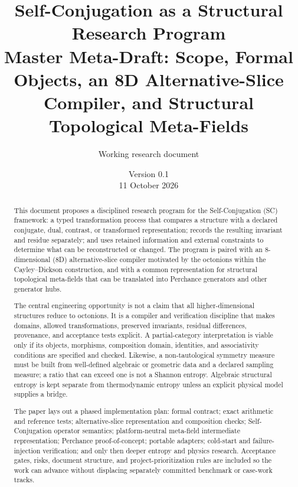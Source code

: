 \documentclass[11pt,oneside]{article}
\title{\textbf{Self-Conjugation as a Structural Research Program}\\[0.4em]
\large Master Meta-Draft: Scope, Formal Objects, an 8D Alternative-Slice Compiler, and Structural Topological Meta-Fields}
\author{Working research document}
\date{Version 0.1 \\ 11 October 2026}
\begin{document}
\maketitle
\begin{center}
\end{center}
\vspace{0.6em}
\begin{abstract}
This document proposes a disciplined research program for the Self-Conjugation (SC) framework: a typed transformation process that compares a structure with a declared conjugate, dual, contrast, or transformed representation; records the resulting invariant and residue separately; and uses retained information and external constraints to determine what can be reconstructed or changed. The program is paired with an 8-dimensional (8D) alternative-slice compiler motivated by the octonions within the Cayley--Dickson construction, and with a common representation for structural topological meta-fields that can be translated into Perchance generators and other generator hubs.

The central engineering opportunity is not a claim that all higher-dimensional structures reduce to octonions. It is a compiler and verification discipline that makes domains, allowed transformations, preserved invariants, residual differences, provenance, and acceptance tests explicit. A partial-category interpretation is viable only if its objects, morphisms, composition domain, identities, and associativity conditions are specified and checked. Likewise, a non-tautological symmetry measure must be built from well-defined algebraic or geometric data and a declared sampling measure; a ratio that can exceed one is not a Shannon entropy. Algebraic structural entropy is kept separate from thermodynamic entropy unless an explicit physical model supplies a bridge.

The paper lays out a phased implementation plan: formal contract; exact arithmetic and reference tests; alternative-slice representation and composition checks; Self-Conjugation operator semantics; platform-neutral meta-field intermediate representation; Perchance proof-of-concept; portable adapters; cold-start and failure-injection verification; and only then deeper entropy and physics research. Acceptance gates, risks, document structure, and project-prioritization rules are included so the work can advance without displacing separately committed benchmark or case-work tracks.
\end{abstract}
\end{document}
